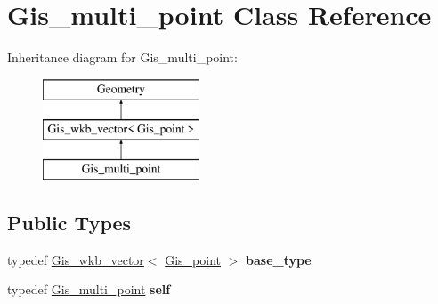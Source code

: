 \hypertarget{classGis__multi__point}{}\section{Gis\+\_\+multi\+\_\+point Class Reference}
\label{classGis__multi__point}
Inheritance diagram for Gis\+\_\+multi\+\_\+point\+:\begin{figure}[H]
\begin{center}
\leavevmode
\includegraphics[height=3.000000cm]{classGis__multi__point}
\end{center}
\end{figure}
\subsection*{Public Types}
\begin{DoxyCompactItemize}
\item 
\mbox{\label{classGis__multi__point_a8842232daa6011d946643a332fdf7e0b}} 
typedef \mbox{\hyperlink{classGis__wkb__vector}{Gis\+\_\+wkb\+\_\+vector}}$<$ \mbox{\hyperlink{classGis__point}{Gis\+\_\+point}} $>$ {\bfseries base\+\_\+type}
\item 
\mbox{\label{classGis__multi__point_ab19e2be41b4d23b5a0f678d43278dbdd}} 
typedef \mbox{\hyperlink{classGis__multi__point}{Gis\+\_\+multi\+\_\+point}} {\bfseries self}
\end{DoxyCompactItemize}
